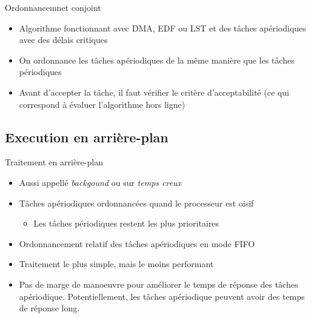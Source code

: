 \begin{frame}{Ordonnancemnet conjoint}
  \begin{itemize} 
  \item  Algorithme fonctionnant  avec DMA,  EDF ou  LST et  des tâches
    apériodiques avec des délais critiques
  \item On  ordonnance les tâches  apériodiques de la même  manière que
    les tâches périodiques
  \item  Avant  d'accepter  la  tâche,  il faut  vérifier  le  critère
    d'acceptabilité (ce qui correspond à évaluer l'algorithme hors ligne)
  \end{itemize} 
\end{frame} 


\subsection{Execution en arrière-plan}

\begin{frame}{Traitement en arrière-plan} 
  \begin{itemize}
  \item Aussi appellé \emph{backgound} ou sur \emph{temps creux}
  \item Tâches apériodiques ordonnancées quand le processeur est oisif 
    \begin{itemize}
    \item Les tâches périodiques restent les plus prioritaires 
    \end{itemize}
  \item Ordonnancement relatif des tâches apériodiques en mode FIFO 
  \item Traitement le plus simple, mais le moins performant 
  \item Pas de  marge de manoeuvre pour améliorer  le temps de réponse
    des  tâches apériodique.  Potentiellement, les  tâches apériodique
    peuvent avoir des temps de réponse long.
  \end{itemize}
\end{frame}

